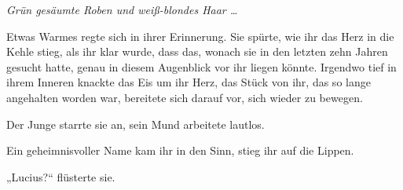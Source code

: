 \emph{Grün gesäumte Roben und weiß-blondes Haar …}

Etwas Warmes regte sich in ihrer Erinnerung. Sie spürte, wie ihr das Herz in die Kehle stieg, als ihr klar wurde, dass das, wonach sie in den letzten zehn Jahren gesucht hatte, genau in diesem Augenblick vor ihr liegen könnte. Irgendwo tief in ihrem Inneren knackte das Eis um ihr Herz, das Stück von ihr, das so lange angehalten worden war, bereitete sich darauf vor, sich wieder zu bewegen.

Der Junge starrte sie an, sein Mund arbeitete lautlos.

Ein geheimnisvoller Name kam ihr in den Sinn, stieg ihr auf die Lippen.

„Lucius?“ flüsterte sie.

